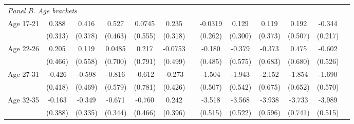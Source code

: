 \begin{landscape}
\begin{table}[H]
\begin{threeparttable}
{\begin{tabular}{l*{12}{c}}
 				\multicolumn{5}{l}{\emph{Panel B. Age brackets}} \\
 				\hspace*{10pt}Age 17-21	&       0.388         &       0.416         &       0.527         &      0.0745         &       0.235   & &    -0.0319         &       0.129         &       0.119         &       0.192         &      -0.344		   \\ 
				                    	&     (0.313)         &     (0.378)         &     (0.463)         &     (0.555)         &     (0.318)   & &    (0.262)         &     (0.300)         &     (0.373)         &     (0.507)         &     (0.217)         \\ 
				\hspace*{10pt}Age 22-26	&       0.205         &       0.119         &      0.0485         &       0.217         &     -0.0753   & &     -0.180         &      -0.379         &      -0.373         &       0.475         &      -0.602         \\ 
				                    	&     (0.466)         &     (0.558)         &     (0.700)         &     (0.791)         &     (0.499)   & &    (0.485)         &     (0.575)         &     (0.683)         &     (0.680)         &     (0.526)         \\ 
				\hspace*{10pt}Age 27-31	&      -0.426         &      -0.598         &      -0.816         &      -0.612         &      -0.273   & &     -1.504\sym{***}&      -1.943\sym{***}&      -2.152\sym{***}&      -1.854\sym{**} &      -1.690\sym{***}\\ 
				                    	&     (0.418)         &     (0.469)         &     (0.579)         &     (0.781)         &     (0.426)   & &    (0.507)         &     (0.542)         &     (0.675)         &     (0.652)         &     (0.570)         \\ 
				\hspace*{10pt}Age 32-35	&      -0.163         &      -0.349         &      -0.671\sym{*}  &      -0.760			&       0.242   & &     -3.518\sym{***}&      -3.568\sym{***}&      -3.938\sym{***}&      -3.733\sym{***}&      -3.989\sym{***}\\ 
				                    	&     (0.388)         &     (0.335)         &     (0.344)         &     (0.466)         &     (0.396)   & &    (0.515)         &     (0.522)         &     (0.596)         &     (0.741)         &     (0.515)         \\ 
 				\bottomrule 
 		\end{tabular}}

\end{threeparttable}
\end{table}
\end{landscape}
